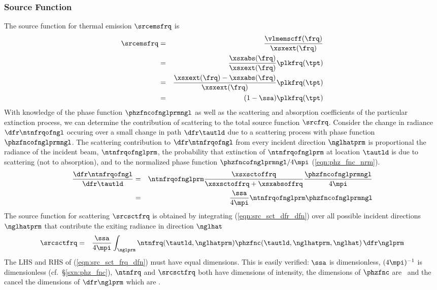 \documentclass[12pt]{article}
\begin{document}
\subsubsection[Source Function]{Source Function}\label{sxn:src_slb}
The source function for thermal emission $\srcemsfrq$ is
\begin{eqnarray}
\srcemsfrq & = & \frac{\vlmemscff(\frq)}{\xsxext(\frq)} \nonumber \\
& = & \frac{\xsxabs(\frq)}{\xsxext(\frq)}\plkfrq(\tpt) \nonumber \\
& = & \frac{\xsxext(\frq)-\xsxabs(\frq)}{\xsxext(\frq)}\plkfrq(\tpt) \nonumber \\
& = & (1-\ssa)\plkfrq(\tpt)
\label{eqn:src_ems_frq_dfn}
\end{eqnarray}
With knowledge of the phase function $\phzfncofnglprmngl$ as well as
the scattering and absorption coefficients of the particular
extinction process, we can determine the contribution of scattering
to the total source function $\srcfrq$.
Consider the change in radiance $\dfr\ntnfrqofngl$ occuring over a
small change in path $\dfr\tautld$ due to a scattering process with
phase function $\phzfncofnglprmngl$.
The scattering contribution to $\dfr\ntnfrqofngl$ from every incident 
direction $\nglhatprm$ is proportional the radiance of the incident
beam, $\ntnfrqofnglprm$, the probability that extinction of
$\ntnfrqofnglprm$ at location $\tautld$ is due to scattering (not to
absorption), and to the normalized phase function
$\phzfncofnglprmngl/4\mpi$ (\ref{eqn:phz_fnc_nrm}). 
\begin{eqnarray}
\frac{\dfr \ntnfrqofngl}{\dfr\tautld} & = & 
\ntnfrqofnglprm \frac{\xsxsctoffrq}{\xsxsctoffrq + \xsxabsoffrq} 
\frac{\phzfncofnglprmngl}{4\mpi} \nonumber \\
& = & 
\frac{\ssa}{4\mpi} \ntnfrqofnglprm \phzfncofnglprmngl
\label{eqn:src_sct_dfr_dfn}
\end{eqnarray}
The source function for scattering $\srcsctfrq$ is obtained by
integrating (\ref{eqn:src_sct_dfr_dfn}) over all possible incident 
directions $\nglhatprm$ that contribute the exiting radiance in 
direction $\nglhat$
\begin{eqnarray}
\srcsctfrq & = & \frac{\ssa}{4\mpi} 
\int_{\nglprm} \ntnfrq(\tautld,\nglhatprm)
 \phzfnc(\tautld,\nglhatprm,\nglhat) \,\dfr\nglprm
\label{eqn:src_sct_frq_dfn}
\end{eqnarray}
The LHS and RHS of (\ref{eqn:src_sct_frq_dfn}) must have equal
dimensions. 
This is easily verified: $\ssa$ is dimensionless, $(4\mpi)^{-1}$ is
dimensionless (cf.~\S\ref{sxn:phz_fnc}), $\ntnfrq$ and $\srcsctfrq$
both have dimensions of intensity, the dimensions of $\phzfnc$ are
\xsr\ and the cancel the dimensions of $\dfr\nglprm$ which are \sr. 
\end{document}
